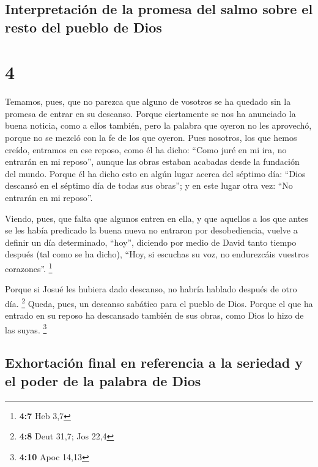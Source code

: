 \begin{paracol}{2}
{\subsection{Interpretación de la promesa del salmo sobre el resto del
pueblo de
Dios}\label{interpretaciuxf3n-de-la-promesa-del-salmo-sobre-el-resto-del-pueblo-de-dios}}

\hypertarget{section-6}{%
\section{4}\label{section-6}}

 Temamos, pues, que no parezca que alguno de vosotros se
ha quedado sin la promesa de entrar en su descanso. 
Porque ciertamente se nos ha anunciado la buena noticia, como a ellos
también, pero la palabra que oyeron no les aprovechó, porque no se
mezcló con la fe de los que oyeron.  Pues nosotros, los
que hemos creído, entramos en ese reposo, como él ha dicho: ``Como juré
en mi ira, no entrarán en mi reposo'', aunque las obras estaban acabadas
desde la fundación del mundo.  Porque él ha dicho esto en
algún lugar acerca del séptimo día: ``Dios descansó en el séptimo día de
todas sus obras'';  y en este lugar otra vez: ``No
entrarán en mi reposo''.

 Viendo, pues, que falta que algunos entren en ella, y que
aquellos a los que antes se les había predicado la buena nueva no
entraron por desobediencia,  vuelve a definir un día
determinado, ``hoy'', diciendo por medio de David tanto tiempo después
(tal como se ha dicho), ``Hoy, si escuchas su voz, no endurezcáis
vuestros corazones''. \footnote{\textbf{4:7} Heb 3,7}

 Porque si Josué les hubiera dado descanso, no habría
hablado después de otro día. \footnote{\textbf{4:8} Deut 31,7; Jos 22,4}
 Queda, pues, un descanso sabático para el pueblo de Dios.
 Porque el que ha entrado en su reposo ha descansado
también de sus obras, como Dios lo hizo de las suyas. \footnote{\textbf{4:10}
  Apoc 14,13}

\hypertarget{exhortaciuxf3n-final-en-referencia-a-la-seriedad-y-el-poder-de-la-palabra-de-dios}{%
\subsection{Exhortación final en referencia a la seriedad y el poder de
la palabra de
Dios}\label{exhortaciuxf3n-final-en-referencia-a-la-seriedad-y-el-poder-de-la-palabra-de-dios}}


\end{paracol}

